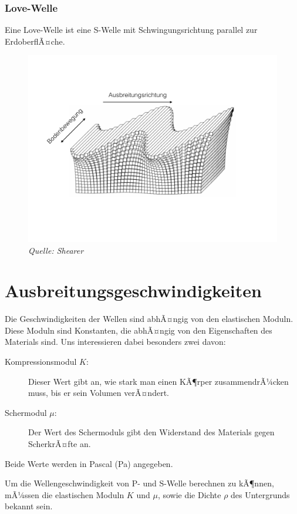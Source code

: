 \subsubsection{Love-Welle}
Eine Love-Welle ist eine S-Welle mit Schwingungsrichtung parallel zur ErdoberflÃ¤che.

\begin{figure}[H]
	\centering
	\includegraphics[width = \textwidth]{SeismikBilder/LoveWelle}
	\caption*{\textsl{Quelle: Shearer}}
\end{figure}


\section{Ausbreitungsgeschwindigkeiten}
Die Geschwindigkeiten der Wellen sind abhÃ¤ngig von den elastischen Moduln. Diese Moduln sind Konstanten, die abhÃ¤ngig von den Eigenschaften des Materials sind.
Uns interessieren dabei besonders zwei davon: \begin{description}
	\item[Kompressionsmodul $K$:] Dieser Wert gibt an, wie stark man einen KÃ¶rper zusammendrÃ¼cken muss, bis er sein Volumen verÃ¤ndert.
	\item[Schermodul $\mu$:] Der Wert des Schermoduls gibt den Widerstand des Materials gegen ScherkrÃ¤fte an.\end{description}

Beide Werte werden in Pascal (\si{Pa}) angegeben.


Um die Wellengeschwindigkeit von P- und S-Welle berechnen zu kÃ¶nnen, mÃ¼ssen die elastischen Moduln $K$ und $\mu$, sowie die Dichte $\rho$ des Untergrunds bekannt sein.

